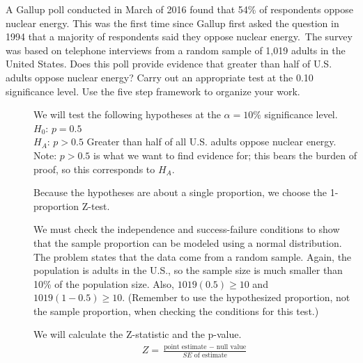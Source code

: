\begin{examplewrap}
\begin{nexample}
{A Gallup poll conducted in March of 2016 found that 54\% of respondents oppose nuclear energy.  This was the first time since Gallup first asked the question in 1994 that a majority of respondents said they oppose nuclear energy.\footnotemark\, The survey was based on telephone interviews from a random sample of 1,019 adults in the United States. Does this poll provide evidence that greater than half of U.S. adults oppose nuclear energy?  Carry out an appropriate test at the 0.10 significance level.  Use the five step framework to organize your work.  }
\label{NuclearEnergy}
\begin{description}
\item[]  We will test the following hypotheses at the $\alpha=10\%$ significance level.\\
$H_0$: $p = 0.5$   \\
$H_A$: $p > 0.5$ \quad Greater than half of all U.S. adults oppose nuclear energy. \\
 
Note: $p>0.5$ is what we want to find evidence for; this bears the burden of proof, so this corresponds to $H_A$.
\item[] Because the hypotheses are about a single proportion, we choose the 1-proportion Z-test.
\item[]  We must check the independence and success-failure conditions to show that the sample proportion can be modeled using a normal distribution.  The problem states that the data come from a random sample.  Again, the population is adults in the U.S., so the sample size is much smaller than 10\% of the population size.  Also, $1019(0.5)\geq10$ and $1019(1-0.5)\geq10$.  (Remember to use the hypothesized proportion, not the sample proportion, when checking the conditions for this test.)
\item[  ]  We will calculate the Z-statistic and the p-value.
\begin{align*}
Z = \frac{\text{point estimate } - \text{ null value}}{SE \text{ of estimate}}
\end{align*}


\end{description}
\end{nexample}
\end{examplewrap}
